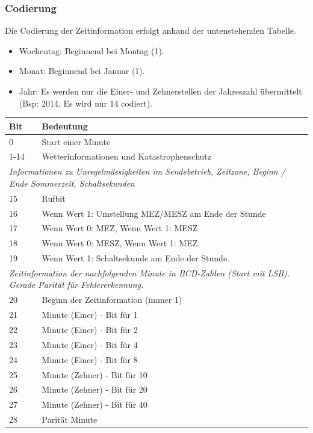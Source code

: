 \subsubsection{Codierung}
Die Codierung der Zeitinformation erfolgt anhand der untenstehenden Tabelle.

\begin{itemize}
\item Wochentag: Beginnend bei Montag (1).
\item Monat: Beginnend bei Januar (1).
\item Jahr: Es werden nur die Einer- und Zehnerstellen der Jahreszahl übermittelt (Bsp: 2014, Es wird nur 14 codiert).
\end{itemize}

\begin{longtable}{p{0.5cm} p{13.5cm}}
\textbf{Bit} & \textbf{Bedeutung} \\ \hline \endhead
0 & Start einer Minute \\
1-14 & Wetterinformationen und Katastrophenschutz \\ \hline
\multicolumn{2}{p{14cm}}{\textit{Informationen zu Unregelmässigkeiten im Sendebetrieb, Zeitzone, Beginn / Ende Sommerzeit, Schaltsekunden}}  \\ \hline
15 & Rufbit \\
16 & Wenn Wert 1: Umstellung MEZ/MESZ am Ende der Stunde \\
17 & Wenn Wert 0: MEZ, Wenn Wert 1: MESZ \\
18 & Wenn Wert 0: MESZ, Wenn Wert 1: MEZ \\
19 & Wenn Wert 1: Schaltsekunde am Ende der Stunde. \\ \hline
\multicolumn{2}{p{14cm}}{\textit{Zeitinformation der nachfolgenden Minute in BCD-Zahlen (Start mit LSB). Gerade Parität für Fehlererkennung.}}  \\ \hline
20 & Beginn der Zeitinformation (immer 1) \\
21 & Minute (Einer) - Bit für 1 \\
22 & Minute (Einer) - Bit für 2 \\
23 & Minute (Einer) - Bit für 4 \\
24 & Minute (Einer) - Bit für 8 \\
25 & Minute (Zehner) - Bit für 10 \\
26 & Minute (Zehner) - Bit für 20 \\
27 & Minute (Zehner) - Bit für 40 \\
28 & Parität Minute \\ \hline

\end{longtable}
